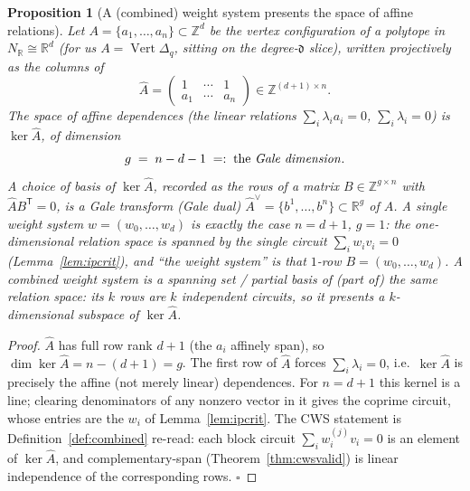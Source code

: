 \documentclass{amsart}
\newtheorem{proposition}[theorem]{Proposition}
\begin{document}
\begin{proposition}[A (combined) weight system presents the space of affine
relations]\label{prop:wsgale}
Let $A=\{a_1,\dots,a_n\}\subset\mathbb Z^{d}$ be the vertex configuration of a
polytope in $N_{\mathbb R}\cong\mathbb R^d$ (for us $A=\operatorname{Vert}
\Delta_q$, sitting on the degree-$\mathfrak d$ slice), written projectively as
the columns of
\begin{equation}\label{eq:Ahat}
  \widehat A=\begin{pmatrix} 1 & \cdots & 1\\ a_1 & \cdots & a_n\end{pmatrix}
  \in\mathbb Z^{(d+1)\times n}.
\end{equation}
The \emph{space of affine dependences} (the linear relations
$\sum_i\lambda_i a_i=0$, $\sum_i\lambda_i=0$) is $\ker\widehat A$, of dimension
\begin{equation}\label{eq:galedim}
  g \;=\; n-d-1 \;=:\; \text{the \emph{Gale dimension}}.
\end{equation}
A choice of basis of $\ker\widehat A$, recorded as the rows of a matrix
$B\in\mathbb Z^{g\times n}$ with $\widehat A B^{\mathsf T}=0$, is a
\emph{Gale transform} (Gale dual) $\widehat A^{\vee}=\{b^1,\dots,b^n\}\subset
\mathbb R^{g}$ of $A$. A single weight system $w=(w_0,\dots,w_d)$ is exactly the
case $n=d+1$, $g=1$: the one-dimensional relation space is spanned by the single
circuit $\sum_i w_i v_i=0$ (Lemma~\ref{lem:ipcrit}), and ``the weight system''
\emph{is} that $1$-row $B=(w_0,\dots,w_d)$. A combined weight system is a
spanning set / partial basis of (part of) the same relation space: its $k$ rows
are $k$ independent circuits, so it presents a $k$-dimensional subspace of
$\ker\widehat A$.
\end{proposition}

\begin{proof}
$\widehat A$ has full row rank $d+1$ (the $a_i$ affinely span), so $\dim\ker
\widehat A=n-(d+1)=g$. The first row of $\widehat A$ forces $\sum_i\lambda_i=0$,
i.e.\ $\ker\widehat A$ is precisely the affine (not merely linear) dependences.
For $n=d+1$ this kernel is a line; clearing denominators of any nonzero vector in
it gives the coprime circuit, whose entries are the $w_i$ of
Lemma~\ref{lem:ipcrit}. The CWS statement is Definition~\ref{def:combined}
re-read: each block circuit $\sum_i w^{(j)}_i v_i=0$ is an element of
$\ker\widehat A$, and complementary-span (Theorem~\ref{thm:cwsvalid}) is linear
independence of the corresponding rows. $\square$
\end{proof}
\end{document}
